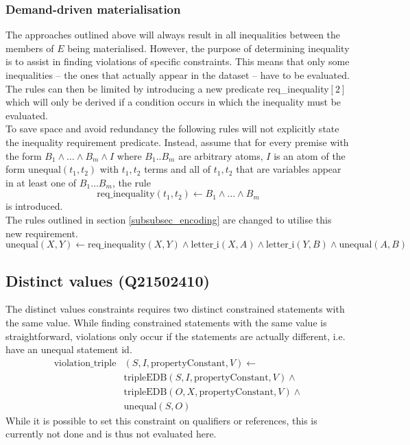 \documentclass[hyperref,bachelorofscience,fleqn]{cgvpub}
\begin{document}
\subsubsection{Demand-driven materialisation}
The approaches outlined above will always result in all inequalities between the members of \(E\) being materialised. However, the purpose of determining inequality is to assist in finding violations of specific constraints. This means that only some inequalities -- the ones that actually appear in the dataset -- have to be evaluated. The rules can then be limited by introducing a new predicate req\_inequality\([2]\) which will only be derived if a condition occurs in which the inequality must be evaluated.\\

To save space and avoid redundancy the following rules will not explicitly state the inequality requirement predicate. Instead, assume that for every premise with the form \(B_1 \wedge \ldots\wedge B_m \wedge I\) where \(B_1 .. B_m\) are arbitrary atoms, \(I\) is an atom of the form \(\text{unequal}(t_1, t_2)\) with \(t_1,t_2\) terms and all of \(t_1,t_2\) that are variables appear in at least one of \(B_1 \ldots B_m\), the rule 
\begin{equation*}
\text{req\_inequality}(t_1, t_2)
 \leftarrow B_1 \wedge \ldots \wedge B_m
\end{equation*} is introduced.\\

The rules outlined in section \ref{subsubsec_encoding} are changed to utilise this new requirement.
\begin{equation*}
\text{unequal}(X, Y) \leftarrow \text{req\_inequality}(X, Y) \wedge \text{letter\_i}(X, A) \wedge \text{letter\_i}(Y, B) \wedge \text{unequal}(A, B)
\end{equation*}


\subsection{Distinct values (Q21502410)}
The distinct values constraints requires two distinct constrained statements with the same value. 
While finding constrained statements with the same value is straightforward, violations only occur if the statements are actually different, i.e. have an unequal statement id.
\begin{equation*}
\begin{split}
\text{violation\_triple}&(S, I, \text{propertyConstant}, V) \leftarrow \\
&\text{tripleEDB}(S, I, \text{propertyConstant}, V) \wedge \\
&\text{tripleEDB}(O, X, \text{propertyConstant}, V) \wedge \\
&\text{unequal}(S, O)
\end{split}
\end{equation*}
While it is possible to set this constraint on qualifiers or references, this is currently not done and is thus not evaluated here.
\end{document}
